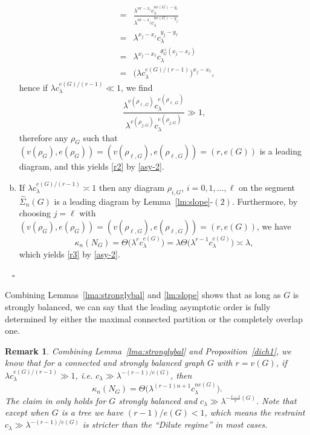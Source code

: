 \documentclass[12pt]{article}
\newtheorem{remark}[prop]{Remark}
\newenvironment{Proof}{\removelastskip\par\medskip
\noindent{\em Proof.} \rm}{\penalty-20\null\hfill$\square$\par\medbreak}
\numberwithin{equation}{section}
\begin{document}
\begin{Proof}
\begin{enumerate}[a)]
\begin{eqnarray*}
  \\
  & = &
  \frac{\lambda^{nr-x_\ell}c_\lambda^{ne(G)-y_\ell}}{\lambda^{nr-x_j}c_\lambda^{ne(G)-y_j}}
  \\
  & = &
  \lambda^{x_j-x_\ell}c_\lambda^{y_j-y_\ell}
  \\
  & = &
  \lambda^{x_j-x_\ell}c_\lambda^{\theta^+_G (x_j-x_\ell )}
  \\
  & = &
  \big(\lambda c_\lambda^{e(G) / ( r-1) }\big)^{x_j-x_\ell}, 
  \end{eqnarray*}
 hence if $\lambda c_\lambda^{e(G)/(r-1)}\ll1$,
    we find 
$$
     \frac{\lambda^{v(\rho_{\ell , G})}c_\lambda^{e(\rho_{\ell , G})}}{\lambda^{v(\rho_{j , G})}c_\lambda^{e(\rho_{j , G})}}\gg 1, 
  $$
 therefore any $\rho_G$ such that 
 $(v(\rho_G),e(\rho_G))=(v(\rho_{\ell , G}),e(\rho_{\ell , G}))=(r,e(G))$
 is a leading diagram, 
 and this yields \eqref{r2} by \eqref{asy-2}.  
 \item
 If $\lambda c_\lambda^{e(G)/(r-1)}\asymp 1$
  then any diagram $\rho_{i,G}$, $i=0,1, \ldots , \ell$
 on the segment $\widehat{\Sigma}_n(G)$
 is a leading diagram by Lemma~\ref{lm:slope}-$(2)$. 
 Furthermore, by choosing $j=\ell$ with
 $(v(\rho_G),e(\rho_G))=(v(\rho_{\ell , G}),e(\rho_{\ell , G}))=(r,e(G))$, 
 we have 
$$
  \kappa_n(N_G)=\Theta\big(\lambda^r c_\lambda^{e(G)}\big)
  =\lambda \Theta\big(\lambda^{r-1} c_\lambda^{e(G)}\big)
  \asymp \lambda, 
$$ 
  which yields \eqref{r3} by \eqref{asy-2}.
\end{enumerate} 
~%
\end{Proof}
Combining Lemmas~\ref{lma:stronglybal} and
 \ref{lm:slope} shows that as long as $G$ is strongly balanced, we can say that the leading asymptotic order is fully determined by either the maximal connected partition or the completely overlap one. 
\begin{remark}
  Combining Lemma~\ref{lma:stronglybal} and Proposition~\ref{dich1}, we know that for a connected and strongly balanced graph $G$ with $r=v(G)$,
  if $\lambda c_\lambda^{e(G) / ( r-1)}\gg1$, i.e. $c_\lambda\gg\lambda^{- ( r-1 )/e(G)}$, 
  then
  $$\kappa_n(N_G)=\Theta\big(\lambda^{(r-1)n+1}c_\lambda^{ne(G)}\big).
  $$
  The claim in \cite[Proposition~6.5]{LiuPrivault} only holds for $G$ strongly balanced and $c_\lambda\gg\lambda^{-\frac{r-1}e(G)}$. Note that except when
   $G$ is a tree we have $(r-1)/e(G)<1$, which means the restraint $c_\lambda\gg\lambda^{- (r-1) / e(G)}$ is stricter than the ``Dilute regime'' in most cases. 
\end{remark}
\end{document}
